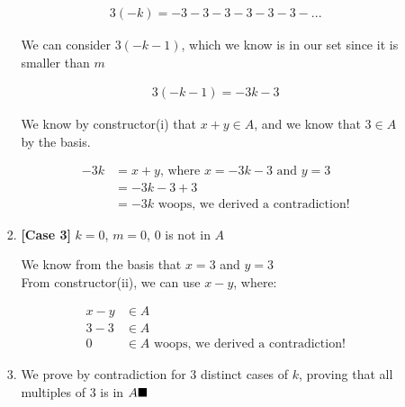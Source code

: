 \documentclass{article}
\begin{document}
\begin{itemize}
\begin{enumerate}[label=(\alph*)]
\begin{enumerate}[label=\arabic*.]
                \begin{align*}
                    3(-k) = -3 -3 -3 -3 -3 -3 -...
                \end{align*}
                \begin{center}
                    We can consider $3(-k - 1)$, which we know is in our set since it is smaller than $m$
                \end{center}
                \begin{align*}
                    3(-k-1) = -3k-3
                \end{align*}
                \begin{center}
                    We know by constructor(i) that $x+y \in A$, and we know that $3 \in A$ by the basis.
                \end{center}
                \begin{align*}
                    -3k &= x+y \text{, where } x = -3k -3 \text{ and } y = 3\\
                        &= -3k -3 + 3\\
                        &= -3k \text{ woops, we derived a contradiction!}
                \end{align*}
                \item \textbf{[Case 3]} $k = 0$, $m = 0$, $0$ is not in $A$
                \begin{center}
                    We know from the basis that $x = 3$ and $y = 3$\\
                    From constructor(ii), we can use $x - y$, where:
                \end{center}
                \begin{align*}
                    x - y &\in A\\
                    3 - 3 &\in A\\
                    0 &\in A \text{ woops, we derived a contradiction!}
                \end{align*}
                \item We prove by contradiction for 3 distinct cases of $k$, proving that all multiples of 3 is in $A \hfill\blacksquare$
            \end{enumerate}
        \end{enumerate}
    \end{itemize}
    
\end{document}

